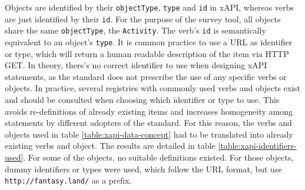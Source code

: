 \documentclass[a4paper,11pt]{article}
\def\inline{\lstinline[basicstyle=\ttfamily,keywordstyle={}]}
\begin{document}
                Objects are identified by their \inline{objectType}, \inline{type} and \inline{id} in xAPI, 
                whereas verbs are just identified by their \inline{id}. For the purpose of the
                survey tool, all objects share the same \inline{objectType}, the \inline{Activity}.
                The verb's \inline{id} is semantically equivalent to an object's \inline{type}.
                It is common practice to use a URL as identifier or type,
                which will return a human readable description of the item via HTTP GET. In theory,
                there's no correct identifier to use when designing xAPI statements, as the
                standard does not prescribe the use of any specific verbs or objects. In practice,
                several registries with commonly used verbs and objects exist and should
                be consulted when choosing which identifier or type to use. This avoids re-definitions
                of already existing items and increases homogeneity among statements by
                different adopters of the standard. For this reason, the verbs and objects 
                used in table \ref{table:xapi-data-concept} had to be translated into already existing
                verbs and object. The results are detailed in table \ref{table:xapi-identifiers-used}.
                For some of the objects, no suitable definitions existed. For those
                objects, dummy identifiers or types were used, which follow the URL format, but use 
                \inline{http://fantasy.land/} as a prefix.
\end{document}
